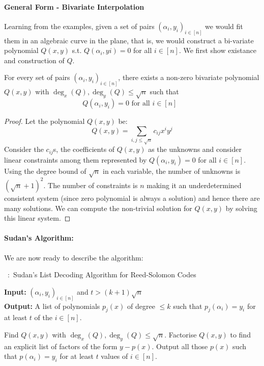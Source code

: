 \paragraph{General Form - Bivariate Interpolation}
Learning from the examples, given a set of pairs ${(\alpha_i , y_i)}_{i\in [n]}$ we would fit them in an algebraic curve in the plane, that is, we would construct a bi-variate polynomial $Q(x,y)$ s.t. $Q(\alpha_i,y i) = 0$ for all $i \in [n]$. We first show existance and construction of $Q$.

\begin{lemma}
\label{lem:bivariate-interpolation} For every set of pairs ${(\alpha_i , y_i)}_{i\in [n]}$, there exists a non-zero
bivariate polynomial $Q(x,y)$ with $\deg_x(Q),\deg_y(Q) \le \sqrt{n}$ such that
$$Q(\alpha_i,y_i) = 0 \textrm{ for all $i \in [n]$ }$$
\end{lemma}
\begin{proof}
Let the polynomial $Q(x,y)$ be: 
$$Q(x,y) = \sum_{i,j \le \sqrt{n}} c_{ij} x^iy^j$$
Consider the $c_{ij}$s, the coefficients of $Q(x,y)$ as the unknowns and consider linear constraints among them represented by $Q(\alpha_i,y_i) = 0$ for all $i \in [n]$. Using the degree bound of $\sqrt{n}$ in each variable, the number of unknowns is $(\sqrt{n}+1)^2$. The number of constraints is $n$ making it an underdetermined consistent system (since zero polynomial is always a solution) and hence there are many solutions. We can compute the non-trivial solution for $Q(x,y)$ by solving this linear system.
\end{proof}

\paragraph{Sudan's Algorithm:}
We are now ready to describe the algorithm:

\begin{algorithm}
\label{alg:Berlekamp-Welch}
\caption{~:~Sudan's List Decoding Algorithm for Reed-Solomon Codes}
{\bf Input:} ${(\alpha_i , y_i)}_{i\in [n]}$ and $t > (k+1)\sqrt{n}$ \\
{\bf Output: } A list of polynomials $p_j(x)$ of degree $\le k$ such that $p_j(\alpha_i) = y_i$ for at least $t$ of the $i \in [n]$.
\begin{algorithmic}[1]
\State Find $Q(x,y)$ with $\deg_x(Q), \deg_y(Q) \le \sqrt{n}$.
\State Factorise $Q(x,y)$ to find an explicit list of factors of the form $y-p(x)$.
\State Output all those $p(x)$ such that 
$p(\alpha_i) = y_i$ for at least $t$ values of $i \in [n]$.
\end{algorithmic}
\end{algorithm}

